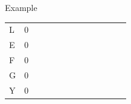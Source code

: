 \documentclass{bredelebeamer}
\begin{document}
\begin{frame}{Example}
\begin{table}[]
\begin{tabular}{*{13}{p{0.4cm}}}
\multicolumn{1}{l|}{L}  & \multicolumn{1}{l|}{0} & \multicolumn{1}{l|}{}  & \multicolumn{1}{l|}{}  & \multicolumn{1}{l|}{}  & \multicolumn{1}{l|}{}  & \multicolumn{1}{l|}{}  & \multicolumn{1}{l|}{}  & \multicolumn{1}{l|}{}  & \multicolumn{1}{l|}{}  & \multicolumn{1}{l|}{}  & \multicolumn{1}{l|}{}  & \multicolumn{1}{l|}{}  \\ \cline{2-13} 
\multicolumn{1}{l|}{E}  & \multicolumn{1}{l|}{0} & \multicolumn{1}{l|}{}  & \multicolumn{1}{l|}{}  & \multicolumn{1}{l|}{}  & \multicolumn{1}{l|}{}  & \multicolumn{1}{l|}{}  & \multicolumn{1}{l|}{}  & \multicolumn{1}{l|}{}  & \multicolumn{1}{l|}{}  & \multicolumn{1}{l|}{}  & \multicolumn{1}{l|}{}  & \multicolumn{1}{l|}{}  \\ \cline{2-13} 
\multicolumn{1}{l|}{F}  & \multicolumn{1}{l|}{0} & \multicolumn{1}{l|}{}  & \multicolumn{1}{l|}{}  & \multicolumn{1}{l|}{}  & \multicolumn{1}{l|}{}  & \multicolumn{1}{l|}{}  & \multicolumn{1}{l|}{}  & \multicolumn{1}{l|}{}  & \multicolumn{1}{l|}{}  & \multicolumn{1}{l|}{}  & \multicolumn{1}{l|}{}  & \multicolumn{1}{l|}{}  \\ \cline{2-13} 
\multicolumn{1}{l|}{G}  & \multicolumn{1}{l|}{0} & \multicolumn{1}{l|}{}  & \multicolumn{1}{l|}{}  & \multicolumn{1}{l|}{}  & \multicolumn{1}{l|}{}  & \multicolumn{1}{l|}{}  & \multicolumn{1}{l|}{}  & \multicolumn{1}{l|}{}  & \multicolumn{1}{l|}{}  & \multicolumn{1}{l|}{}  & \multicolumn{1}{l|}{}  & \multicolumn{1}{l|}{}  \\ \cline{2-13} 
\multicolumn{1}{l|}{Y}  & \multicolumn{1}{l|}{0} & \multicolumn{1}{l|}{}  & \multicolumn{1}{l|}{}  & \multicolumn{1}{l|}{}  & \multicolumn{1}{l|}{}  & \multicolumn{1}{l|}{}  & \multicolumn{1}{l|}{}  & \multicolumn{1}{l|}{}  & \multicolumn{1}{l|}{}  & \multicolumn{1}{l|}{}  & \multicolumn{1}{l|}{}  & \multicolumn{1}{l|}{}  \\ \cline{2-13} 
\end{tabular}
\end{table}
     
 \end{frame}
 
\end{document}
